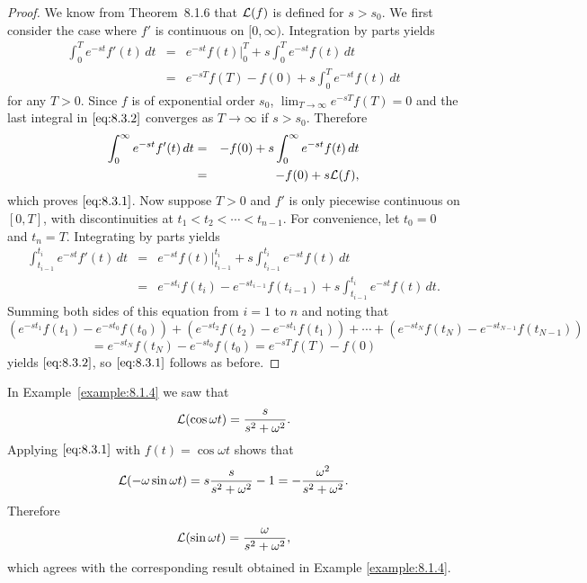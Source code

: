 \documentclass{ximera}
\begin{document}
\begin{proof}

We know from Theorem~8.1.6 that ${\cal L}(f)$ is defined for
$s>s_0$.
We first consider the case where $f'$ is continuous on $[0,\infty)$.
Integration by parts yields
\begin{equation}\label{eq:8.3.2}
\begin{array}{ccl}
\int^T_0 e^{-st}f'(t)\,dt &=& e^{-st}f(t)\Big|^T_0+s
\int^T_0e^{-st}f(t)\,dt\\
&=& e^{-sT}f(T)-f(0)+s\int^T_0 e^{-st}f(t)\,dt
\end{array}
\end{equation}
for any $T>0$. Since $f$ is of exponential order $s_0$,
 $\lim_{T\to \infty}e^{-sT}f(T)=0$ and the last integral in
$\eqref{eq:8.3.2}$ converges as $T\to\infty$ if $s> s_0$. Therefore
\begin{eqnarray*}
\int^\infty_0 e^{-st}f'(t)\,dt&=&-f(0)+s\int^\infty_0
e^{-st}f(t)\,dt\\ &=&-f(0)+s{\cal L}(f),
\end{eqnarray*}
which proves $\eqref{eq:8.3.1}$.
Now  suppose $T>0$  and $f'$  is  only piecewise continuous on
$[0,T]$, with discontinuities  at $t_1 <  t_2 <\cdots <  t_{n-1}$. For
convenience,  let  $t_0=0$  and  $t_n=T$.  Integrating by parts yields
\begin{eqnarray*}       \int^{t_i}_{t_{i-1}}e^{-st}f'(t)\,dt       &=&
e^{-st}f(t)\Big|^{t_i}_{t_{i-1}}+s\int^{t_i}_{t_{i-1}}e^{-st}f(t)\,dt\\
&=&                         e^{-st_i}                          f(t_i)-
e^{-st_{i-1}}f(t_{i-1})+s\int^{t_i}_{t_{i-1}}e^{-st}f(t)\,dt.
\end{eqnarray*} Summing both sides of this equation from $i=1$ to  $n$
and noting that
$$
\left(e^{-st_1}f(t_1)-e^{-st_0}f(t_0)\right)+\left(e^{-st_2}
f(t_2)-e^{-st_1}f(t_1)\right)
+\cdots+\left(e^{-st_N}f(t_N)-e^{-st_{N-1}}f(t_{N-1})\right)
$$
$$
=e^{-st_N}f(t_N)-e^{-st_0}f(t_0)=e^{-sT}f(T)-f(0)
$$
yields $\eqref{eq:8.3.2}$, so $\eqref{eq:8.3.1}$ follows as before.
\end{proof}

\begin{example}\label{example:8.3.1}
 In Example~\ref{example:8.1.4} we saw that
$$
{\cal L}(\cos\omega t)=\frac{s}{s^2+\omega^2}.
$$
Applying $\eqref{eq:8.3.1}$ with $f(t)=\cos\omega t$ shows that
$$
{\cal L}(-\omega\sin\omega t)=s \frac{s}{s^2+\omega^2}-1=-
\frac{\omega^2}{s^2+\omega^2}.
$$
Therefore
$$
{\cal L}(\sin\omega t)=\frac{\omega}{s^2+\omega^2},
$$
which agrees with the corresponding result obtained  in Example \ref{example:8.1.4}.
\end{example}
\end{document}
